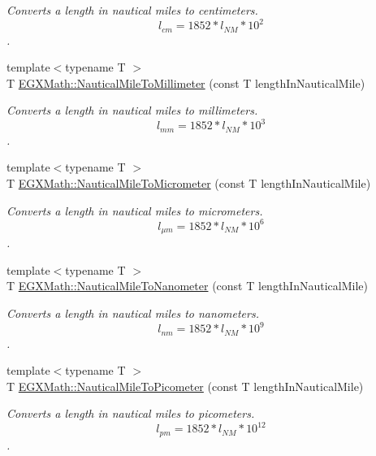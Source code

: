 \begin{DoxyCompactItemize}
\begin{DoxyCompactList}\small\item\em Converts a length in nautical miles to centimeters. \[ l_{cm}=1852 * l_{NM} * 10^{2} \]. \end{DoxyCompactList}\item 
{\footnotesize template$<$typename T $>$ }\\T \mbox{\hyperlink{group___e_g_x_math-_conversions-_length_conversions-_nautical-_nautical_mile-_s_i_ga10840f2eeeb3fe428db89373cb306246}{E\+G\+X\+Math\+::\+Nautical\+Mile\+To\+Millimeter}} (const T length\+In\+Nautical\+Mile)
\begin{DoxyCompactList}\small\item\em Converts a length in nautical miles to millimeters. \[ l_{mm}=1852 * l_{NM} * 10^{3} \]. \end{DoxyCompactList}\item 
{\footnotesize template$<$typename T $>$ }\\T \mbox{\hyperlink{group___e_g_x_math-_conversions-_length_conversions-_nautical-_nautical_mile-_s_i_ga8ce271a279676a3461dddc59c6a9720b}{E\+G\+X\+Math\+::\+Nautical\+Mile\+To\+Micrometer}} (const T length\+In\+Nautical\+Mile)
\begin{DoxyCompactList}\small\item\em Converts a length in nautical miles to micrometers. \[ l_{\mu m}=1852 * l_{NM} * 10^{6} \]. \end{DoxyCompactList}\item 
{\footnotesize template$<$typename T $>$ }\\T \mbox{\hyperlink{group___e_g_x_math-_conversions-_length_conversions-_nautical-_nautical_mile-_s_i_ga914f8e21cf415b90729304b19eec1f05}{E\+G\+X\+Math\+::\+Nautical\+Mile\+To\+Nanometer}} (const T length\+In\+Nautical\+Mile)
\begin{DoxyCompactList}\small\item\em Converts a length in nautical miles to nanometers. \[ l_{nm}=1852 * l_{NM} * 10^{9} \]. \end{DoxyCompactList}\item 
{\footnotesize template$<$typename T $>$ }\\T \mbox{\hyperlink{group___e_g_x_math-_conversions-_length_conversions-_nautical-_nautical_mile-_s_i_ga5ab6a92054685d45fb032111bcde94e0}{E\+G\+X\+Math\+::\+Nautical\+Mile\+To\+Picometer}} (const T length\+In\+Nautical\+Mile)
\begin{DoxyCompactList}\small\item\em Converts a length in nautical miles to picometers. \[ l_{pm}=1852 * l_{NM} * 10^{12} \]. \end{DoxyCompactList}\item 

\end{DoxyCompactItemize}
